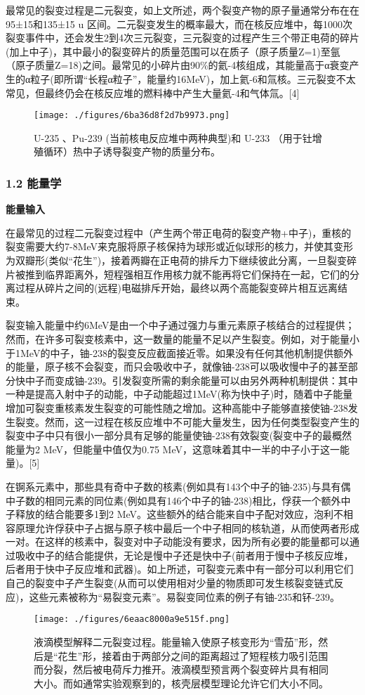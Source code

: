最常见的裂变过程是二元裂变，如上文所述，两个裂变产物的原子量通常分布在在95±15和135±15 u 区间。二元裂变发生的概率最大，而在核反应堆中，每1000次裂变事件中，还会发生2到4次三元裂变，三元裂变的过程产生三个带正电荷的碎片(加上中子)，其中最小的裂变碎片的质量范围可以在质子（原子质量Z=1)至氩（原子质量Z=18)之间。最常见的小碎片由90\%的氦-4核组成，其能量高于α衰变产生的α粒子(即所谓“长程α粒子”，能量约16MeV)，加上氦-6和氚核。三元裂变不太常见，但最终仍会在核反应堆的燃料棒中产生大量氦-4和气体氚。[4]
\begin{figure}[ht]
\centering
\texttt{[image: ./figures/6ba36d8f2d7b9973.png]}
\caption{U-235 、Pu-239 (当前核电反应堆中两种典型)和 U-233 （用于钍增殖循环）热中子诱导裂变产物的质量分布。} \label{fig_HLB_2}
\end{figure}

\subsubsection{1.2 能量学}
\textbf{能量输入}

在最常见的过程二元裂变过程中（产生两个带正电荷的裂变产物+中子)，重核的裂变需要大约7-8MeV来克服将原子核保持为球形或近似球形的核力，并使其变形为双瓣形(类似“花生”)，接着两瓣在正电荷的排斥力下继续彼此分离，一旦裂变碎片被推到临界距离外，短程强相互作用核力就不能再将它们保持在一起，它们的分离过程从碎片之间的(远程)电磁排斥开始，最终以两个高能裂变碎片相互远离结束。

裂变输入能量中约6MeV是由一个中子通过强力与重元素原子核结合的过程提供；然而，在许多可裂变核素中，这一数量的能量不足以产生裂变。例如，对于能量小于1MeV的中子，铀-238的裂变反应截面接近零。如果没有任何其他机制提供额外的能量，原子核不会裂变，而只会吸收中子，就像铀-238可以吸收慢中子的甚至部分快中子而变成铀-239。引发裂变所需的剩余能量可以由另外两种机制提供：其中一种是提高入射中子的动能，中子动能超过1MeV(称为快中子)时，随着中子能量增加可裂变重核素发生裂变的可能性随之增加。这种高能中子能够直接使铀-238发生裂变。然而，这一过程在核反应堆中不可能大量发生，因为任何类型裂变产生的裂变中子中只有很小一部分具有足够的能量使铀-238有效裂变(裂变中子的最概然能量为2 MeV，但能量中值仅为0.75 MeV，这意味着其中一半的中子小于这一能量)。[5]

在锕系元素中，那些具有奇中子数的核素(例如具有143个中子的铀-235)与具有偶中子数的相同元素的同位素(例如具有146个中子的铀-238)相比，俘获一个额外中子释放的结合能要多1到2 MeV。这些额外的结合能来自中子配对效应，泡利不相容原理允许俘获中子占据与原子核中最后一个中子相同的核轨道，从而使两者形成一对。在这样的核素中，裂变对中子动能没有要求，因为所有必要的能量都可以通过吸收中子的结合能提供，无论是慢中子还是快中子(前者用于慢中子核反应堆，后者用于快中子反应堆和武器)。如上所述，可裂变元素中有一部分可以利用它们自己的裂变中子产生裂变(从而可以使用相对少量的物质即可发生核裂变链式反应)，这些元素被称为“易裂变元素”。易裂变同位素的例子有铀-235和钚-239。
\begin{figure}[ht]
\centering
\texttt{[image: ./figures/6eaac8000a9e515f.png]}
\caption{液滴模型解释二元裂变过程。能量输入使原子核变形为“雪茄”形，然后是“花生”形，接着由于两部分之间的距离超过了短程核力吸引范围而分裂，然后被电荷斥力推开。液滴模型预言两个裂变碎片具有相同大小。而如通常实验观察到的，核壳层模型理论允许它们大小不同。} \label{fig_HLB_3}
\end{figure}

